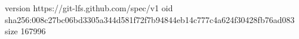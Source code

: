 version https://git-lfs.github.com/spec/v1
oid sha256:008c27bc06bd3305a344d581f72f7b94844eb14c777c4a624f30428fb76ad083
size 167996
